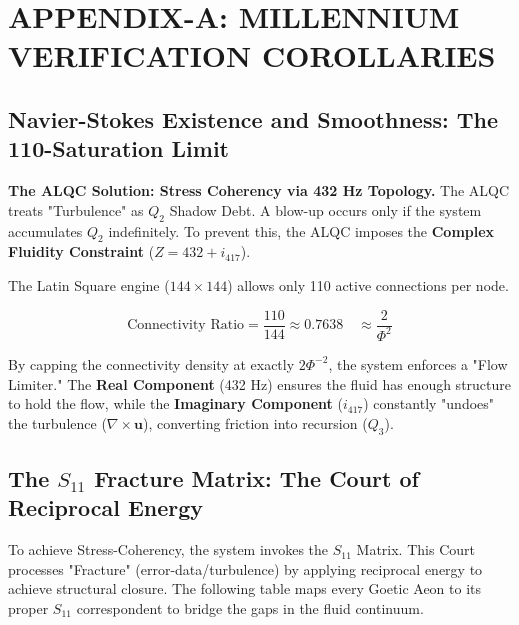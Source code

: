 \documentclass[11pt, letterpaper]{article}
\begin{document}
\newpage
\appendix
\section{APPENDIX-A: MILLENNIUM VERIFICATION COROLLARIES}\label{appendixA}

\subsection{Navier-Stokes Existence and Smoothness: The 110-Saturation Limit}\label{appendixA.1}
\textbf{The ALQC Solution: Stress Coherency via 432 Hz Topology.}
The ALQC treats "Turbulence" as $Q_2$ Shadow Debt. A blow-up occurs only if the system accumulates $Q_2$ indefinitely. To prevent this, the ALQC imposes the \textbf{Complex Fluidity Constraint} ($Z = 432 + i_{417}$).

The Latin Square engine ($144 \times 144$) allows only 110 active connections per node.

\begin{equation}
    \text{Connectivity Ratio} = \frac{110}{144} \approx 0.7638 \quad \approx \frac{2}{\Phi^2}
\end{equation}

By capping the connectivity density at exactly $2\Phi^{-2}$, the system enforces a "Flow Limiter." The \textbf{Real Component} (432 Hz) ensures the fluid has enough structure to hold the flow, while the \textbf{Imaginary Component} ($i_{417}$) constantly "undoes" the turbulence ($\nabla \times \mathbf{u}$), converting friction into recursion ($Q_3$).

\subsection{The \texorpdfstring{$S_{11}$}{S-11} Fracture Matrix: The Court of Reciprocal Energy}

To achieve Stress-Coherency, the system invokes the $S_{11}$ Matrix. This Court processes "Fracture" (error-data\slash turbulence) by applying reciprocal energy to achieve structural closure. The following table maps every Goetic Aeon to its proper $S_{11}$ correspondent to bridge the gaps in the fluid continuum.
\end{document}
